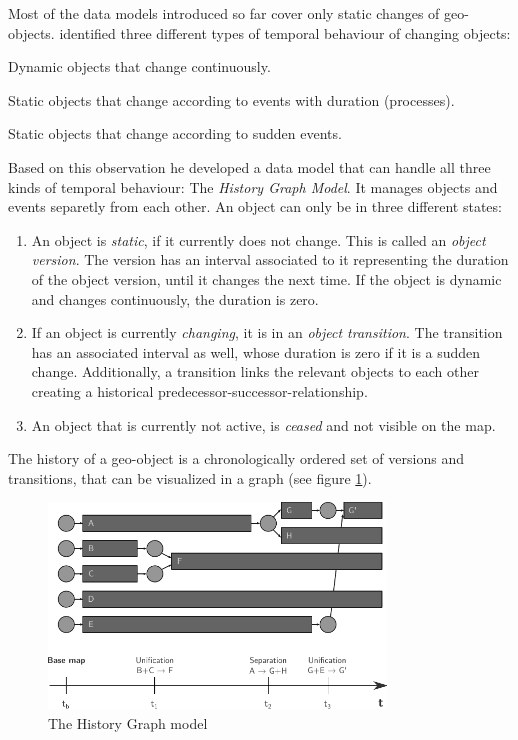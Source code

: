 Most of the data models introduced so far cover only static changes of geo-objects. \cite{key} identified three different types of temporal behaviour of changing objects:
\begin{compactitem}
  \item Dynamic objects that change continuously.
  \item Static objects that change according to events with duration (processes).
  \item Static objects that change according to sudden events.
\end{compactitem}

Based on this observation he developed a data model that can handle all three kinds of temporal behaviour: The \emph{History Graph Model}. It manages objects and events separetly from each other. An object can only be in three different states:
\begin{enumerate}
  \item An object is \emph{static}, if it currently does not change. This is called an \emph{object version}. The version has an interval associated to it representing the duration of the object version, until it changes the next time. If the object is dynamic and changes continuously, the duration is zero.
  \item If an object is currently \emph{changing}, it is in an \emph{object transition}. The transition has an associated interval as well, whose duration is zero if it is a sudden change. Additionally, a transition links the relevant objects to each other creating a historical predecessor-successor-relationship.
  \item An object that is currently not active, is \emph{ceased} and not visible on the map.
\end{enumerate}

The history of a geo-object is a chronologically ordered set of versions and transitions, that can be visualized in a graph (see figure \ref{fig:history_graph_model}).

\begin{figure}[ht]
  \centering
  \includegraphics[width=0.8\textwidth]{graphics/basics/stdm/history_graph_model}
  \caption{The History Graph model}
  \label{fig:history_graph_model}
\end{figure}

